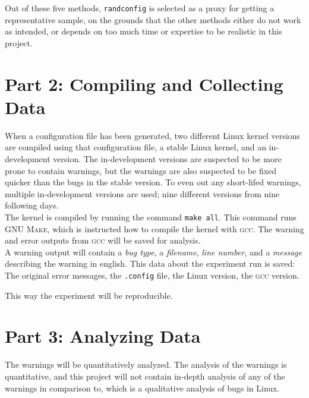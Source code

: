 \documentclass[a4paper,11pt]{report}
\newcommand{\textcode}[1]{\fboxsep=1pt\texttt{\colorbox{gray!20}{#1}}}
\begin{document}
Out of these five methods, \texttt{randconfig} is selected as a proxy for 
getting a representative sample, on the grounds that the other methods either
do not work as intended, or depends on too much time or expertise to be realistic 
in this project.

            \section{Part 2: Compiling and Collecting Data}

When a configuration file has been generated, two different Linux kernel 
versions are compiled using that configuration file, a stable Linux kernel, and 
an in-development version. The in-development versions are suspected to be more 
prone to contain warnings, but the warnings are also suspected to be fixed 
quicker than the bugs in the stable version. To even out any short-lifed 
warnings, multiple in-development versions are used; nine different versions 
from nine following days.
\\

The kernel is compiled by running the command \textcode{make all}. This command 
runs \textsc{GNU Make}, which is instructed how to compile the kernel with 
\textsc{gcc}. The warning and error outputs from \textsc{gcc} will be saved for analysis.
\\

A warning output will contain a \emph{bug type}, a \emph{filename}, \emph{line 
number}, and a \emph{message} describing the warning in english. This data about the
experiment run is saved: The original error messages, the \texttt{.config} file, 
the Linux version, the \textsc{gcc} version.

This way the experiment will be reproducible.






            \section{Part 3: Analyzing Data}
The warnings will be quantitatively analyzed.  The analysis of the warnings is 
 quantitative, and this project will not contain in-depth analysis of 
any of the warnings in comparison to\cite{42bugs}, which is a qualitative 
analysis of bugs in Linux.
\end{document}
